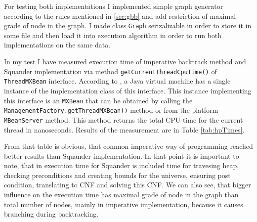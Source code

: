 \documentclass[11pt,twoside,a4paper]{book}
\begin{document}


For testing both implementations I implemented simple graph generator
according to the rules mentioned in \ref{sec:gbb} and add restriction of maximal
grade of node in the graph. I made class \verb|Graph| serizalizable in order to
store it in some file and then load it into execution algorithm in order to run
both implementations on the same data.

In my test I have measured execution time of imperative backtrack method and
Squander implementation via method \verb|getCurrentThreadCpuTime()| of
\verb|ThreadMXBean| interface. According to \cite{oracle:javadoc}, a Java
virtual machine has a single instance of the implementation class of this interface. This instance implementing this
interface is an \verb|MXBean| that can be obtained by calling the
\verb|ManagementFactory.getThreadMXBean()| method or from the platform
\verb|MBeanServer| method. This method returns the total CPU time for the
current thread in nanoseconds. Results of the measurement are in Table
\ref{tab:hpTimes}.

From that table is obvious, that common imperative way of programming reached
better results than Squander implementation. In that point it is important to
note, that in execution time for Squander is included time for travesing heap,
checking preconditions and creating bounds for the universe, ensuring post
condition, translating to CNF and solving this CNF. We can also see, that bigger
influence on the execution time has maximal grade of node in the graph than
total number of nodes, mainly in imperative implementation, because it causes
branching during backtracking.
\end{document}
